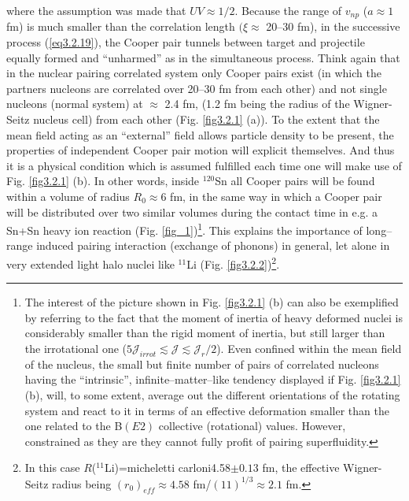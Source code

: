 where the assumption was made that $UV\approx1/2$. Because the range of $v_{np}$ ($a\approx 1$ fm) is much smaller than the correlation length $(\xi\approx$ 20--30 fm), in the successive process (\ref{eq3.2.19}), the Cooper pair tunnels between target and projectile equally formed and ``unharmed'' as in the simultaneous process. Think again that in the nuclear pairing correlated system only Cooper pairs exist  (in which the partners nucleons are correlated over 20--30 fm from each other) and not single nucleons (normal system)  at $\approx$ 2.4 fm, (1.2 fm being the radius of the Wigner-Seitz nucleus cell) from each other (Fig. \ref{fig3.2.1} (a)). To the extent that the mean field acting as an ``external'' field allows particle density to be present, the properties of independent Cooper pair motion will explicit themselves. And thus it is a physical condition which is assumed fulfilled each time one will make use of Fig. \ref{fig3.2.1} (b). In other words, inside $^{120}$Sn all Cooper pairs will be found within a volume of radius $R_0\approx 6$ fm, in the same way in which a Cooper pair will be distributed over two similar volumes during the contact time  in e.g. a Sn+Sn heavy ion reaction (Fig. \ref{fig_1})\footnote{The interest of the  picture shown in Fig. \ref{fig3.2.1} (b) can also be exemplified by referring to the fact that the moment of inertia of heavy deformed nuclei is considerably smaller than the rigid moment of inertia, but still larger than the irrotational one ($5\mathcal J_{irrot}\lesssim\mathcal J\lesssim  \mathcal J_r/2$). Even confined within the mean field of the nucleus, the small but finite number of pairs of correlated nucleons having the ``intrinsic'', infinite--matter--like tendency displayed if Fig. \ref{fig3.2.1} (b), will, to some extent, average out the different orientations of the rotating system and react to it in terms of an effective deformation smaller than the one related to the B$(E2)$ collective (rotational) values. However, constrained as they are they cannot fully profit of pairing superfluidity.}.  This explains the importance of long--range induced pairing interaction (exchange of phonons) in general, let alone in very extended light halo nuclei like $^{11}$Li (Fig. \ref{fig3.2.2})\footnote{In this case $R$($^{11}$Li)=micheletti carloni4.58$\pm0.13$ fm, the effective Wigner-Seitz radius being $(r_0)_{eff}\approx 4.58$ fm/$(11)^{1/3}\approx2.1$ fm.}.

